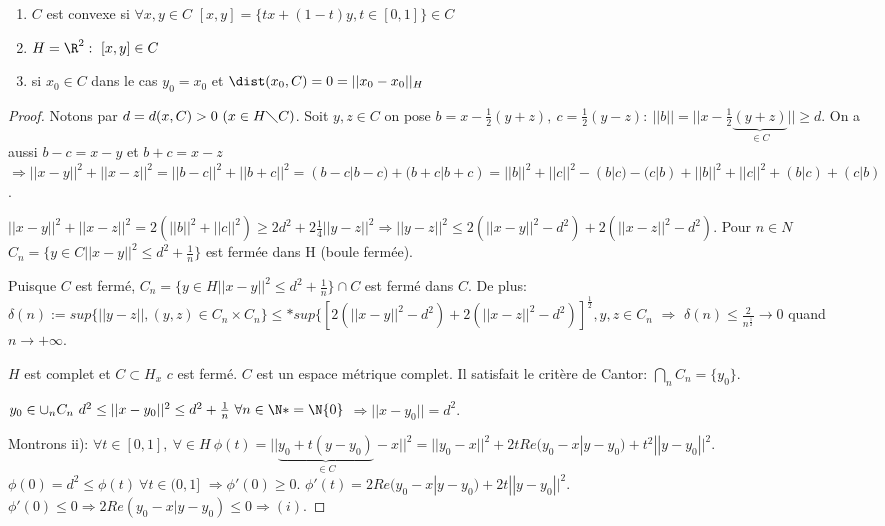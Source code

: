 \begin{remark}
	\leavevmode
	\begin{enumerate}
		\item $C$ est convexe si $\forall x, y \in C$ $[x,y]=\{tx+(1-t)y, t\in[0,1]\}\in C$
		\item $H=\R^2:\ [x,y]\in C$
		\item si $x_0\in C$ dans le cas $y_0=x_0$ et $\dist(x_0, C)=0=||x_0-x_0||_H$
	\end{enumerate}
\end{remark}





\begin{proof}
	Notons par $d=d(x,C)>0\ (x\in H\diagdown C)$. Soit $y, z\in C$ on pose $b=x-\frac12(y+z),\ c=\frac12(y-z):\ ||b||=||x-\frac12\underbrace{(y+z)}_{\in C}||\geq d$. On a aussi $b-c=x-y$ et $b+c=x-z$ $\Rightarrow ||x-y||^2+||x-z||^2=||b-c||^2+||b+c||^2=(b-c| b-c)+(b+c|b+c)=||b||^2+||c||^2-(b|c)-(c|b)+||b||^2+||c||^2 + (b|c)+(c|b)$.
	
	$||x-y||^2+||x-z||^2=2(||b||^2+||c||^2)\geq 2 d^2+2\frac14||y-z||^2 \Rightarrow ||y-z||^2\leq 2(||x-y||^2-d^2)+2(||x-z||^2-d^2)$. Pour $n\in N$ $C_n=\{y\in C ||x-y||^2\leq d^2+\frac1n\}$ est fermée dans H (boule fermée).
	
	Puisque $C$ est fermé, $C_n=\{y\in H ||x-y||^2\leq d^2+\frac1n\}\cap C$ est fermé dans $C$.
	De plus: $\delta (n):=sup\{||y-z||, (y,z)\in C_n\times C_n\}\leq * sup\{[2(||x-y||^2-d^2)+2(||x-z||^2-d^2)]^\frac12, y,z\in C_n$ $\Rightarrow$ $\delta (n)\leq \frac2{n^\frac12}\to 0$ quand $n\to +\infty$.

$H$ est complet et $C\subset H_x$ $c$ est fermé. $C$ est un espace métrique complet. Il satisfait le critère de Cantor: $\bigcap\limits_n C_n=\{y_0\}$.


$y_0\in\cup_n C_n\ d^2\leq ||x-y_0||^2\leq d^2+\frac1n\ \forall n\in\N*=\N\\\{0\}$
$\Rightarrow ||x-y_0||=d^2$.

Montrons ii): $\forall t\in[0,1],\ \forall\in H\ \phi(t)=||\underbrace{y_0+t(y-y_0)}_{\in C}-x||^2 = ||y_0-x||^2+2tRe(y_0-x|y-y_0)+t^2||y-y_0||^2$. $\phi(0)=d^2\leq \phi(t)\ \forall t\in(0,1]$ $\Rightarrow \phi'(0)\geq 0$. $\phi'(t)=2Re(y_0-x|y-y_0)+2t||y-y_0||^2$. $\phi'(0)\leq 0 \Rightarrow 2Re(y_0-x|y-y_0)\leq 0\Rightarrow (i)$.

\end{proof}


